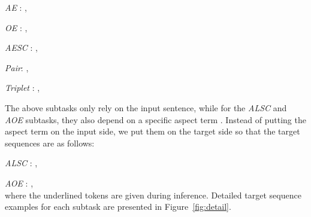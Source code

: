 \documentclass[11pt,a4paper]{article}
\begin{document}
 \emph{AE} : ,

 \emph{OE} : ,

 \emph{AESC} : ,

  \emph{Pair}: ,

 \emph{Triplet} :  ,

The above subtasks only rely on the input sentence, while for the \emph{ALSC} and \emph{AOE}  subtasks, they also depend on a specific aspect term . Instead of putting the aspect term on the input side, we put them on the target side so that the target sequences are as follows:

 \emph{ALSC} : ,

 \emph{AOE} : ,\\
where the underlined tokens are given during inference. Detailed target sequence examples for each subtask are presented in Figure~\ref{fig:detail}.
\end{document}
